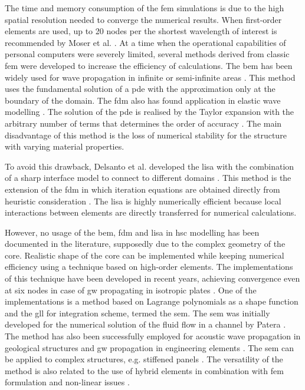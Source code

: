 \documentclass[11pt,a4paper,final]{report}
\theoremstyle{plain}
\begin{document}
The time and memory consumption of the \ac{fem} simulations is due to the high spatial resolution needed to converge the numerical results.
When first-order elements are used, up to 20 nodes per the shortest wavelength of interest is recommended by Moser et al. \cite{moser1999modeling}.
At a time when the operational capabilities of personal computers were severely limited, several methods derived from classic \ac{fem} were developed to increase the efficiency of calculations.
The \ac{bem} has been widely used for wave propagation in infinite or semi-infinite areas \cite{brebbia1984boundary}.
This method uses the fundamental solution of a \ac{pde} with the approximation only at the boundary of the domain.
The \ac{fdm} also has found application in elastic wave modelling \cite{delsantoO1992connection}.
The solution of the \ac{pde} is realised by the Taylor expansion with the arbitrary number of terms that determines the order of accuracy \cite{willberg2015simulation}.
The main disadvantage of this method is the loss of numerical stability for the structure with varying material properties.

To avoid this drawback, Delsanto et al. developed the \ac{lisa} with the combination of a sharp interface model to connect to different domains \cite{delsantoO1992connection}. This method is the extension of the \ac{fdm} in which iteration equations are obtained directly from heuristic consideration \cite{willberg2015simulation}.
The \ac{lisa} is highly numerically efficient because local interactions between elements are directly transferred for numerical calculations.

However, no usage of the \ac{bem}, \ac{fdm} and \ac{lisa} in \ac{hsc} modelling has been documented in the literature, supposedly due to the complex geometry of the core.
Realistic shape of the core can be implemented while keeping numerical efficiency using a technique based on high-order elements.
The implementations of this technique have been developed in recent years, achieving convergence even at six nodes in case of \ac{gw} propagating in isotropic plates \cite{willberg2012comparison}.
One of the implementations is a method based on Lagrange polynomials as a shape function and the \ac{gll} for integration scheme, termed the \ac{sem}.
The \ac{sem} was initially developed for the numerical solution of the fluid flow in a channel by Patera \cite{patera1984spectral}.
The method has also been successfully employed for acoustic wave propagation in geological structures \cite{seriani1994spectral, komatitsch2000simulation} and \ac{gw} propagation in engineering elements \cite{kudela2007wave, ostachowicz2011guided, rucka2010experimental,rekatsinas2017cubic}.
The \ac{sem} can be applied to complex structures, e.g. stiffened panels \cite{schulte2011simulation, lonkar2014modeling}.
The versatility of the method is also related to the use of hybrid elements in combination with \ac{fem} formulation \cite{ha2009optimizing} and non-linear issues \cite{yu2020time, li2021hybrid}.
\end{document}
